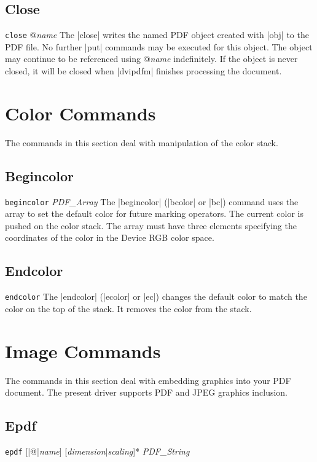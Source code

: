 {\subsection{Close}
\syntax
{\tt close} @{\it name}
\description
The |close| writes the named PDF object created with |obj| to the PDF file.
No further |put| commands may be executed for this object.
The object may continue to be referenced using @{\it name}
indefinitely.  If the object is never closed, it will
be closed when |dvipdfm| finishes processing the document.

\section{Color Commands}
The commands in this section deal with manipulation of the color
stack.

\subsection{Begincolor}
\syntax
{\tt begincolor} {\it PDF\_Array}
\description
The |begincolor| (|bcolor| or |bc|) command uses the
array to set the default color for future marking operators.
The current color is pushed on the color stack.  The
array must have three elements specifying the coordinates
of the color in the Device RGB color space.
\example
\begintt
{}
\endtt

\subsection{Endcolor}
\syntax
{\tt endcolor}
\description
The |endcolor| (|ecolor| or |ec|)
changes the default color to
match the color on the top
of the stack.  It removes
the color from the stack.
\example
\begintt
{}
\endtt


\section{Image Commands}
The commands in this section deal with embedding
graphics into your PDF document.  The present
driver supports PDF and JPEG graphics inclusion.

\subsection{Epdf}
\syntax
{\tt epdf} [|@|{\it name}] [{\it dimension}$\vert${\it scaling}]*  {\it PDF\_String}

}
